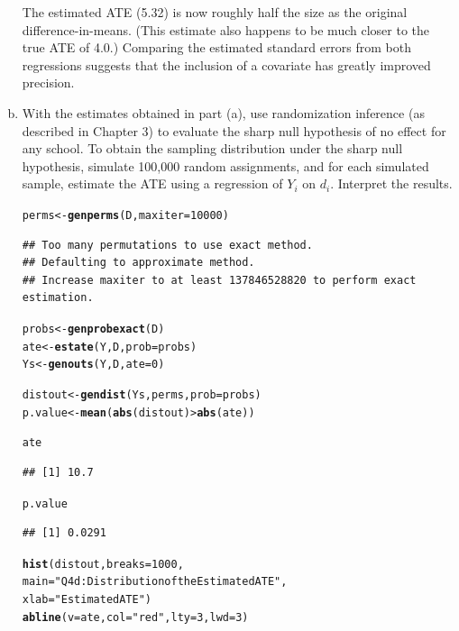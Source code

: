 \documentclass[11pt,notitlepage]{article}\usepackage[]{graphicx}\usepackage[]{color}
\makeatletter
\newcommand{\hlnum}[1]{\textcolor[rgb]{0.686,0.059,0.569}{#1}}%
\newcommand{\hlstr}[1]{\textcolor[rgb]{0.192,0.494,0.8}{#1}}%
\newcommand{\hlopt}[1]{\textcolor[rgb]{0,0,0}{#1}}%
\newcommand{\hlstd}[1]{\textcolor[rgb]{0.345,0.345,0.345}{#1}}%
\newcommand{\hlkwb}[1]{\textcolor[rgb]{0.69,0.353,0.396}{#1}}%
\newcommand{\hlkwc}[1]{\textcolor[rgb]{0.333,0.667,0.333}{#1}}%
\newcommand{\hlkwd}[1]{\textcolor[rgb]{0.737,0.353,0.396}{\textbf{#1}}}%
\newenvironment{kframe}{%
 \def\at@end@of@kframe{}%
 \ifinner\ifhmode%
  \def\at@end@of@kframe{\end{minipage}}%
  \begin{minipage}{\columnwidth}%
 \fi\fi%
 \def\FrameCommand##1{\hskip\@totalleftmargin \hskip-\fboxsep
 \colorbox{shadecolor}{##1}\hskip-\fboxsep
     \hskip-\linewidth \hskip-\@totalleftmargin \hskip\columnwidth}%
 \MakeFramed {\advance\hsize-\width
   \@totalleftmargin\z@ \linewidth\hsize
   \@setminipage}}%
 {\par\unskip\endMakeFramed%
 \at@end@of@kframe}
\newenvironment{knitrout}{}{} %
\makeatother
\begin{document}
\begin{enumerate}[a)]
The estimated ATE (5.32) is now roughly half the size as the original difference-in-means.  (This estimate also happens to be much closer to the true ATE of 4.0.) Comparing the estimated standard errors from both regressions suggests that the inclusion of a covariate has greatly improved precision.

\item With the estimates obtained in part (a), use randomization inference (as described in Chapter 3) to evaluate the sharp null hypothesis of no effect for any school. To obtain the sampling distribution under the sharp null hypothesis, simulate 100,000 random assignments, and for each simulated sample, estimate the ATE using a regression of $Y_i$ on $d_i$. Interpret the results.  

\begin{knitrout}
\color{fgcolor}\begin{kframe}
\begin{alltt}
\hlstd{perms} \hlkwb{<-} \hlkwd{genperms}\hlstd{(D,}\hlkwc{maxiter}\hlstd{=}\hlnum{10000}\hlstd{)}
\end{alltt}
\begin{verbatim}
## Too many permutations to use exact method.
## Defaulting to approximate method.
## Increase maxiter to at least 137846528820 to perform exact estimation.
\end{verbatim}
\begin{alltt}
\hlstd{probs} \hlkwb{<-} \hlkwd{genprobexact}\hlstd{(D)}
\hlstd{ate} \hlkwb{<-} \hlkwd{estate}\hlstd{(Y,D,}\hlkwc{prob}\hlstd{=probs)}
\hlstd{Ys} \hlkwb{<-} \hlkwd{genouts}\hlstd{(Y,D,}\hlkwc{ate}\hlstd{=}\hlnum{0}\hlstd{)}

\hlstd{distout} \hlkwb{<-} \hlkwd{gendist}\hlstd{(Ys,perms,}\hlkwc{prob}\hlstd{=probs)}
\hlstd{p.value} \hlkwb{<-} \hlkwd{mean}\hlstd{(}\hlkwd{abs}\hlstd{(distout)}\hlopt{>}\hlkwd{abs}\hlstd{(ate))}

\hlstd{ate}
\end{alltt}
\begin{verbatim}
## [1] 10.7
\end{verbatim}
\begin{alltt}
\hlstd{p.value}
\end{alltt}
\begin{verbatim}
## [1] 0.0291
\end{verbatim}
\begin{alltt}
\hlkwd{hist}\hlstd{(distout,} \hlkwc{breaks}\hlstd{=}\hlnum{1000}\hlstd{,}
     \hlkwc{main}\hlstd{=}\hlstr{"Q4d: Distribution of the Estimated ATE"}\hlstd{,}
     \hlkwc{xlab}\hlstd{=}\hlstr{"Estimated ATE"}\hlstd{)}
\hlkwd{abline}\hlstd{(}\hlkwc{v}\hlstd{=ate,} \hlkwc{col}\hlstd{=}\hlstr{"red"}\hlstd{,} \hlkwc{lty}\hlstd{=}\hlnum{3}\hlstd{,} \hlkwc{lwd}\hlstd{=}\hlnum{3}\hlstd{)}
\end{alltt}
\end{kframe}


\end{knitrout}
\end{enumerate}
\end{document}
